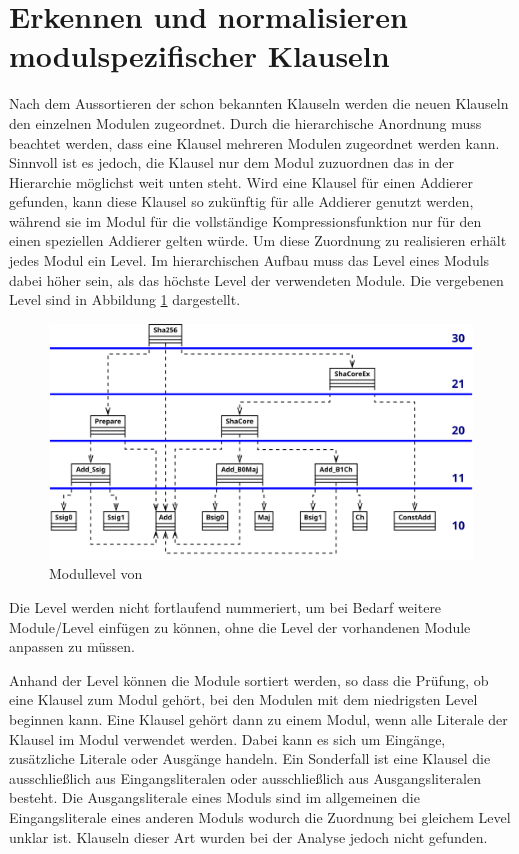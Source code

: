 \section{Erkennen und normalisieren modulspezifischer Klauseln}
\label{sec:ana:module}

Nach dem Aussortieren der schon bekannten Klauseln werden die neuen Klauseln den einzelnen Modulen zugeordnet. Durch die hierarchische Anordnung
muss beachtet werden, dass eine Klausel mehreren Modulen zugeordnet werden kann. Sinnvoll ist es jedoch, die Klausel nur dem Modul zuzuordnen
das in der Hierarchie möglichst weit unten steht. Wird eine Klausel für einen Addierer gefunden, kann diese Klausel so zukünftig für alle Addierer
genutzt werden, während sie im Modul für die vollständige Kompressionsfunktion nur für den einen speziellen Addierer gelten würde. Um diese
Zuordnung zu realisieren erhält jedes Modul ein Level. Im hierarchischen Aufbau muss das Level eines Moduls dabei höher sein, als das höchste Level
der verwendeten Module. Die vergebenen Level sind in Abbildung \ref{fig:sha256_module_level} dargestellt.
\begin{figure}[!h]
  \centering
  \includegraphics[scale=0.265]{images/module_level}
  \caption{Modullevel von }
  \label{fig:sha256_module_level}
\end{figure}

Die Level werden nicht fortlaufend nummeriert, um bei Bedarf weitere Module/Level einfügen zu können, ohne die Level der vorhandenen Module anpassen zu müssen.

Anhand der Level können die Module sortiert werden, so dass die Prüfung, ob eine Klausel zum Modul gehört, bei den Modulen mit dem niedrigsten Level beginnen kann.
Eine Klausel gehört dann zu einem Modul, wenn alle Literale der Klausel im Modul verwendet werden. Dabei kann es sich um Eingänge, zusätzliche Literale oder Ausgänge
handeln. Ein Sonderfall ist eine Klausel die ausschließlich aus Eingangsliteralen oder ausschließlich aus Ausgangsliteralen besteht. Die Ausgangsliterale eines Moduls
sind im allgemeinen die Eingangsliterale eines anderen Moduls wodurch die Zuordnung bei gleichem Level unklar ist. Klauseln dieser Art wurden bei der Analyse jedoch
nicht gefunden. 

